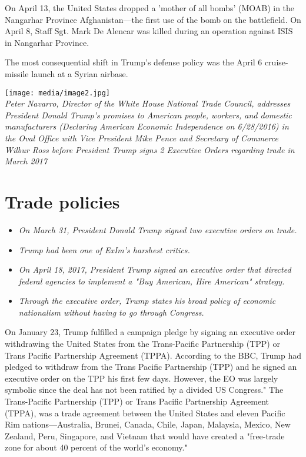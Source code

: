 On April 13, the United States dropped a 'mother of all bombs' (MOAB) in
the Nangarhar Province Afghanistan---the first use of the bomb on the
battlefield. On April 8, Staff Sgt. Mark De Alencar was killed during an
operation against ISIS in Nangarhar Province.

The most consequential shift in Trump's defense policy was the April 6
cruise-missile launch at a Syrian airbase.

\texttt{[image: media/image2.jpg]}\\
\emph{Peter Navarro, Director of the White House National Trade Council,
addresses President Donald Trump's promises to American people, workers,
and domestic manufacturers (Declaring American Economic Independence on
6/28/2016) in the Oval Office with Vice President Mike Pence and
Secretary of Commerce Wilbur Ross before President Trump signs 2
Executive Orders regarding trade in March 2017}

\section{Trade policies}\label{trade-policies}

\begin{itemize}
\item
  \emph{On March 31, President Donald Trump signed two executive orders
  on trade.}
\item
  \emph{Trump had been one of ExIm's harshest critics.}
\item
  \emph{On April 18, 2017, President Trump signed an executive order
  that directed federal agencies to implement a "Buy American, Hire
  American" strategy.}
\item
  \emph{Through the executive order, Trump states his broad policy of
  economic nationalism without having to go through Congress.}
\end{itemize}

On January 23, Trump fulfilled a campaign pledge by signing an executive
order withdrawing the United States from the Trans-Pacific Partnership
(TPP) or Trans Pacific Partnership Agreement (TPPA). According to the
BBC, Trump had pledged to withdraw from the Trans Pacific Partnership
(TPP) and he signed an executive order on the TPP his first few days.
However, the EO was largely symbolic since the deal has not been
ratified by a divided US Congress." The Trans-Pacific Partnership (TPP)
or Trans Pacific Partnership Agreement (TPPA), was a trade agreement
between the United States and eleven Pacific Rim nations---Australia,
Brunei, Canada, Chile, Japan, Malaysia, Mexico, New Zealand, Peru,
Singapore, and Vietnam that would have created a "free-trade zone for
about 40 percent of the world's economy."

